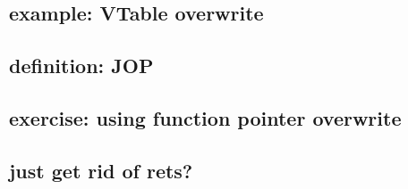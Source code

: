 \subsection{example: VTable overwrite}



\subsection{definition: JOP}



\subsection{exercise: using function pointer overwrite}


\subsection{just get rid of rets?}

